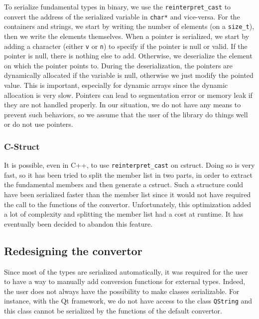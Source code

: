 To serialize fundamental types in binary, we use the \texttt{reinterpret\_cast}
to convert the address of the serialized variable in \texttt{char*} and
vice-versa. For the containers and strings, we start by writing the number of
elements (on a \texttt{size\_t}), then we write the elements themselves. When a
pointer is serialized, we start by adding a character (either \texttt{v} or
\texttt{n}) to specify if the pointer is null or valid. If the pointer is null,
there is nothing else to add. Otherwise, we deserialize the element on which the
pointer points to. During the deserialization, the pointers are dynamically
allocated if the variable is null, otherwise we just modify the pointed value.
This is important, especially for dynamic arrays since the dynamic allocation is
very slow. Pointers can lead to segmentation error or memory leak if they are
not handled properly. In our situation, we do not have any means to prevent such
behaviors, so we assume that the user of the library do things well or do not
use pointers.

\subsubsection{C-Struct}

It is possible, even in C++, to use \texttt{reinterpret\_cast} on
\gls{cstruct}. Doing so is very fast, so it has been tried to split the member
list in two parts, in order to extract the fundamental members and then generate
a \gls{cstruct}. Such a structure could have been serialized faster than the
member list since it would not have required the call to the functions of the
convertor. Unfortunately, this optimization added a lot of complexity and
splitting the member list had a cost at runtime. It has eventually been decided
to abandon this feature.

\subsection{Redesigning the convertor}
\label{sec:convertor}

Since most of the types are serialized automatically, it was required for the
user to have a way to manually add conversion functions for external types.
Indeed, the user does not always have the possibility to make classes
serializable. For instance, with the Qt framework, we do not have access to the
class \texttt{QString} and this class cannot be serialized by the functions of
the default convertor.

